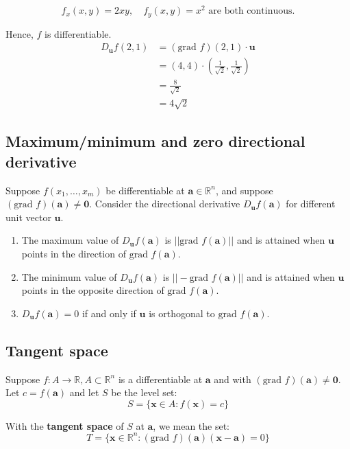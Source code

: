 \documentclass[11pt]{article}
\begin{document}
\[f_x(x, y) = 2xy, \quad f_y(x, y) = x^2 \text{ are both continuous.}\]

Hence, \(f\) is differentiable.
\begin{align*}
D_{\boldsymbol{u}} f(2, 1) &= (\text{grad } f)(2, 1) \cdot \boldsymbol{u} \\
&= (4, 4) \cdot \left(\frac{1}{\sqrt{2}}, \frac{1}{\sqrt{2}} \right) \\
&= \frac{8}{\sqrt{2}} \\
&= 4 \sqrt{2}
\end{align*}
\subsection{Maximum/minimum and zero directional derivative}
\label{sec:org523e9d8}
Suppose \(f(x_1, \ldots, x_m)\) be differentiable at \(\boldsymbol{a} \in \mathbb{R}^n\), and suppose \((\text{grad } f)(\boldsymbol{a}) \ne \boldsymbol{0}\). Consider the directional derivative \(D_{\boldsymbol{u}} f(\boldsymbol{a})\) for different unit vector \(\boldsymbol{u}\).

\begin{enumerate}
\item The maximum value of \(D_{\boldsymbol{u}}f(\boldsymbol{a})\) is \(||\text{grad } f(\boldsymbol{a})||\) and is attained when \(\boldsymbol{u}\) points in the direction of \(\text{grad } f(\boldsymbol{a})\).
\item The minimum value of \(D_{\boldsymbol{u}} f(\boldsymbol{a})\) is \(||- \text{grad } f(\boldsymbol{a})||\) and is attained when \(\boldsymbol{u}\) points in the opposite direction of \(\text{grad } f(\boldsymbol{a})\).
\item \(D_{\boldsymbol{u}}f(\boldsymbol{a}) = 0\) if and only if \(\boldsymbol{u}\) is orthogonal to \(\text{grad } f(\boldsymbol{a})\).
\end{enumerate}
\subsection{Tangent space}
\label{sec:org02d4ede}
Suppose \(f : A \rightarrow \mathbb{R}, A \subset \mathbb{R}^n\) is a differentiable at \(\boldsymbol{a}\) and with \((\text{grad } f)(\boldsymbol{a}) \ne \boldsymbol{0}\). Let \(c = f(\boldsymbol{a})\) and let \(S\) be the level set:
\[S = \{\boldsymbol{x} \in A : f(\boldsymbol{x}) = c\}\]

With the \textbf{tangent space} of \(S\) at \(\boldsymbol{a}\), we mean the set:
\[T = \{\boldsymbol{x} \in \mathbb{R}^n : (\text{grad } f)(\boldsymbol{a})(\boldsymbol{x} - \boldsymbol{a}) = 0\}\]
\end{document}
